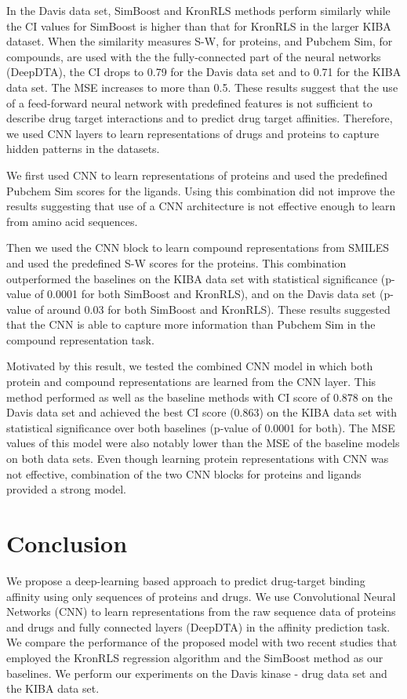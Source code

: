 \documentclass[11pt,letterpaper]{article}
\begin{document}
In the Davis data set,  SimBoost and KronRLS methods perform similarly while the CI values for SimBoost is higher than that for KronRLS in the larger KIBA dataset. When the similarity measures S-W, for proteins, and Pubchem Sim, for compounds, are used with the the fully-connected part of the neural networks (DeepDTA), the CI drops to 0.79 for the Davis data set and to 0.71 for the KIBA data set. The MSE increases to more than 0.5. These results suggest that  the use of a feed-forward neural network with predefined features is not sufficient  to describe drug target interactions and to predict drug target affinities. Therefore, we used CNN layers to learn representations of drugs and proteins to capture hidden patterns in the datasets.

We first used CNN to learn representations of proteins and used the predefined Pubchem Sim scores for the ligands. Using this combination did not improve the results suggesting that use of a CNN architecture is not effective enough to learn from amino acid sequences. 

Then we used the CNN block to learn compound representations from SMILES and used the predefined S-W scores for the proteins. This combination outperformed the baselines on the KIBA data set with statistical significance (p-value of 0.0001 for both SimBoost and KronRLS), and on the Davis data set  (p-value of around 0.03 for both SimBoost and KronRLS). These results suggested that the CNN is able to capture more information than Pubchem Sim in the compound representation task.

Motivated by this result, we tested the combined CNN model in which both protein and compound representations are learned from the CNN layer. This method performed as well as the baseline methods with CI score of 0.878 on the Davis data set and achieved the best  CI score (0.863)  on the KIBA data set with statistical significance over both baselines (p-value of 0.0001 for both).  The MSE values of this model were also notably lower than the MSE of the baseline models on both data sets. Even though learning protein representations with CNN was not effective, combination of the two CNN blocks for proteins and ligands provided a strong model.


\section*{Conclusion}

We propose a deep-learning based approach to predict drug-target binding affinity using only sequences of proteins and drugs. We use Convolutional Neural Networks (CNN) to learn representations from the raw sequence data of proteins and drugs and  fully connected layers (DeepDTA) in the affinity prediction task. We compare the performance of the proposed model with two recent studies that employed the KronRLS regression algorithm \cite{pahikkala2014toward}  and the SimBoost method \cite{he2017simboost} as our baselines. We perform our experiments on the Davis kinase - drug data set and the KIBA data set. 
\end{document}
